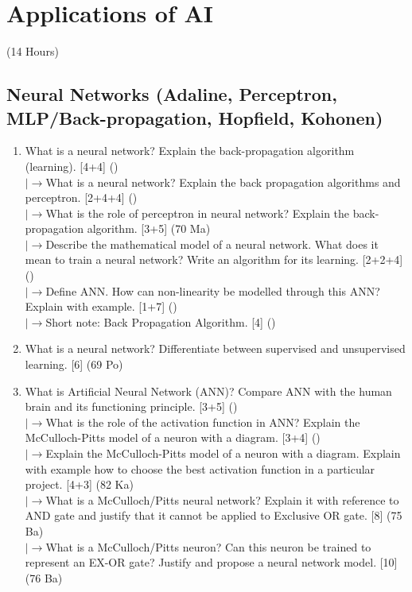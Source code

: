 \documentclass[12pt]{article}
\newcommand{\lb}{\\$\left|\rightarrow\right.$}
\begin{document}
\pagebreak
\section{Applications of AI}
\begin{center}(14 Hours)\end{center}

  \subsection{Neural Networks (Adaline, Perceptron, MLP/Back-propagation, Hopfield, Kohonen)}
    \begin{enumerate}[topsep=0pt, noitemsep]
      \item What is a neural network? Explain the back-propagation algorithm (learning). \hfill [4+4] ()
        \lb What is a neural network? Explain the back propagation algorithms and perceptron. \hfill [2+4+4] ()
        \lb What is the role of perceptron in neural network? Explain the back-propagation algorithm. \hfill [3+5] (70 Ma)
        \lb Describe the mathematical model of a neural network. What does it mean to train a neural network? Write an algorithm for its learning. \hfill [2+2+4] ()
        \lb Define ANN. How can non-linearity be modelled through this ANN? Explain with example. \hfill [1+7] ()
        \lb Short note: Back Propagation Algorithm. \hfill [4] ()

      \item What is a neural network? Differentiate between supervised and unsupervised learning. \hfill [6] (69 Po)

      \item What is Artificial Neural Network (ANN)? Compare ANN with the human brain and its functioning principle. \hfill [3+5] ()
        \lb What is the role of the activation function in ANN? Explain the McCulloch-Pitts model of a neuron with a diagram. \hfill [3+4] ()
        \lb Explain the McCulloch-Pitts model of a neuron with a diagram. Explain with example how to choose the best activation function in a particular project. \hfill [4+3] (82 Ka)
        \lb What is a McCulloch/Pitts neural network? Explain it with reference to AND gate and justify that it cannot be applied to Exclusive OR gate. \hfill [8] (75 Ba)
        \lb What is a McCulloch/Pitts neuron? Can this neuron be trained to represent an EX-OR gate? Justify and propose a neural network model. \hfill [10] (76 Ba)


\end{enumerate}
\end{document}
